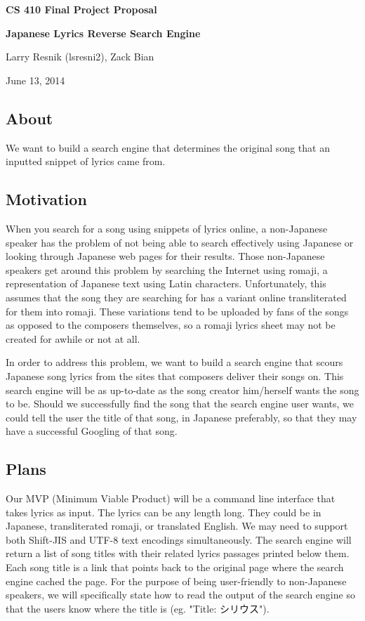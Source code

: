 \documentclass[a4paper]{article}
\begin{document}
\begin{CJK}{UTF8}{zhsong}
\begin{center}
{\Large \textbf{CS 410 Final Project Proposal}}

{\Large \textbf{Japanese Lyrics Reverse Search Engine}}

Larry Resnik (lsresni2), Zack Bian

June 13, 2014
\end{center}
\subsection*{About}
We want to build a search engine that determines the original song that an inputted snippet of lyrics came from.
\subsection*{Motivation}
When you search for a song using snippets of lyrics online, a non-Japanese speaker has the problem of not being able to search effectively using Japanese or looking through Japanese web pages for their results. Those non-Japanese speakers get around this problem by searching the Internet using romaji, a representation of Japanese text using Latin characters. Unfortunately, this assumes that the song they are searching for has a variant online transliterated for them into romaji. These variations tend to be uploaded by fans of the songs as opposed to the composers themselves, so a romaji lyrics sheet may not be created for awhile or not at all.

In order to address this problem, we want to build a search engine that scours Japanese song lyrics from the sites that composers deliver their songs on. This search engine will be as up-to-date as the song creator him/herself wants the song to be. Should we successfully find the song that the search engine user wants, we could tell the user the title of that song, in Japanese preferably, so that they may have a successful Googling of that song.
\subsection*{Plans}
Our MVP (Minimum Viable Product) will be a command line interface that takes lyrics as input. The lyrics can be any length long. They could be in Japanese, transliterated romaji, or translated English. We may need to support both Shift-JIS and UTF-8 text encodings simultaneously. The search engine will return a list of song titles with their related lyrics passages printed below them. Each song title is a link that points back to the original page where the search engine cached the page. For the purpose of being user-friendly to non-Japanese speakers, we will specifically state how to read the output of the search engine so that the users know where the title is (eg. "Title: シリウス").


\end{CJK}
\end{document}
